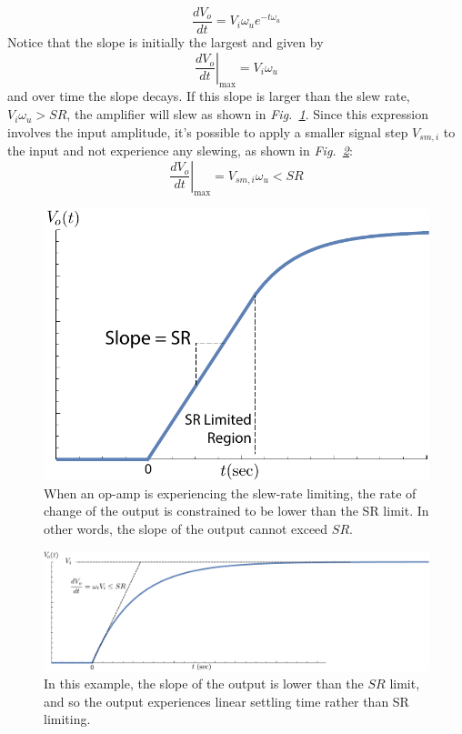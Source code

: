     \begin{equation}
        \frac{dV_{o}}{dt} = V_i \omega_u e^{-t \omega_u}
    \end{equation}
Notice that the slope is initially the largest and given by
    \begin{equation}
        \left. \frac{dV_{o}}{dt} \right|_{\text{max}} = V_i \omega_u
    \end{equation}
and over time the slope decays. If this slope is larger than the slew rate, $V_i \omega_u > SR$, the amplifier will slew as shown in \emph{Fig.~\ref{fig:SR_case1}}.  Since this expression involves the input amplitude, it's possible to apply a smaller signal step $V_{sm,i}$ to the input and not experience any slewing, as shown in \emph{Fig.~\ref{fig:SR_case2}}:  
    \begin{equation}
        \left. \frac{dV_{o}}{dt} \right|_{\text{max}} = V_{sm,i} \omega_u  < SR
    \end{equation}
\begin{figure}[tb]
\centering
\includegraphics[width=.65\columnwidth]{SR_case1}
\caption{When an op-amp is experiencing the slew-rate limiting, the rate of change of the output is constrained to be lower than the SR limit.  In other words, the slope of the output cannot exceed $SR$.} \label{fig:SR_case1}
\end{figure} 
\begin{figure}[tb]
\centering
\includegraphics[width=.8\columnwidth]{SR_case2}
\caption{In this example, the slope of the output is lower than the $SR$ limit, and so the output experiences linear settling time rather than SR limiting.}
\label{fig:SR_case2}
\end{figure}
